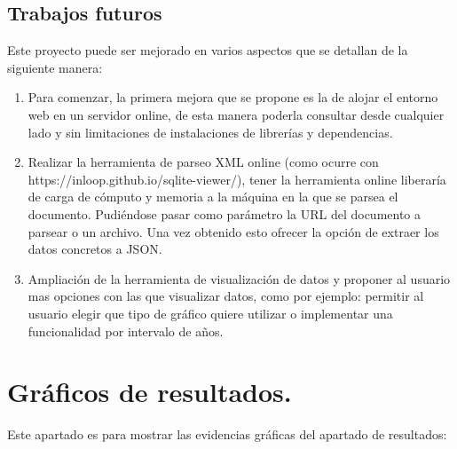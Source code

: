 \documentclass[a4paper, 12pt]{book}
\begin{document}
\section{Trabajos futuros}
\label{sec:trabajos_futuros}

Este proyecto puede ser mejorado en varios aspectos que se detallan de la siguiente manera:

\begin{enumerate}
    \item Para comenzar, la primera mejora que se propone es la de alojar el entorno web en un servidor online, de esta manera poderla consultar desde cualquier lado y sin limitaciones de instalaciones de librerías y dependencias.
    \item Realizar la herramienta de parseo XML online (como ocurre con https://inloop.github.io/sqlite-viewer/), tener la herramienta online liberaría de carga de cómputo y memoria a la máquina en la que se parsea el documento. Pudiéndose pasar como parámetro la URL del documento a parsear o un archivo. Una vez obtenido esto ofrecer la opción de extraer los datos concretos a JSON.
    \item Ampliación de la herramienta de visualización de datos y proponer al usuario mas opciones con las que visualizar datos, como por ejemplo: permitir al usuario elegir que tipo de gráfico quiere utilizar o implementar una funcionalidad por intervalo de años.
    
\end{enumerate}



\cleardoublepage
\appendix
\chapter{Gráficos de resultados.}
\label{app:manual}

Este apartado es para mostrar las evidencias gráficas del apartado de resultados:
\end{document}
